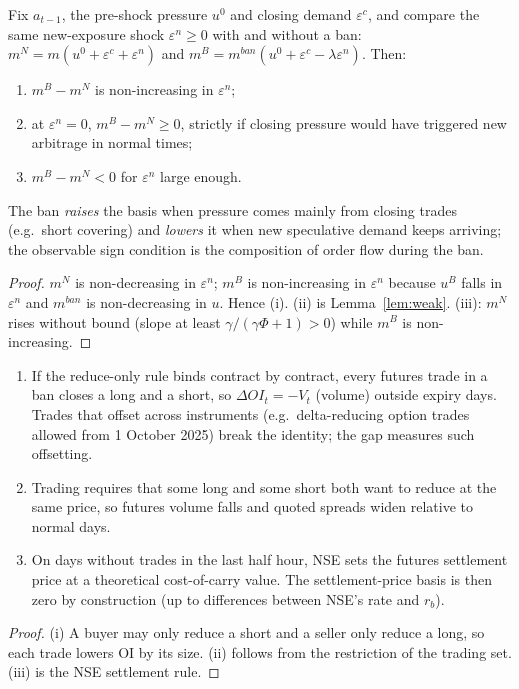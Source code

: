 \begin{proposition}\label{prop:level}
Fix $a_{t-1}$, the pre-shock pressure $u^0$ and closing demand $\varepsilon^c$, and compare the same new-exposure shock
$\varepsilon^n\ge0$ with and without a ban: $m^N=m(u^0+\varepsilon^c+\varepsilon^n)$ and
$m^B=m^{ban}(u^0+\varepsilon^c-\lambda\varepsilon^n)$. Then:
\begin{enumerate}[label=(\roman*),leftmargin=1.8em,itemsep=1pt]
\item $m^B-m^N$ is non-increasing in $\varepsilon^n$;
\item at $\varepsilon^n=0$, $m^B-m^N\ge0$, strictly if closing pressure would have triggered new arbitrage in normal times;
\item $m^B-m^N<0$ for $\varepsilon^n$ large enough.
\end{enumerate}
The ban \emph{raises} the basis when pressure comes mainly from closing trades (e.g.\ short covering) and \emph{lowers} it
when new speculative demand keeps arriving; the observable sign condition is the composition of order flow during the ban.
\end{proposition}
\begin{proof}
$m^N$ is non-decreasing in $\varepsilon^n$; $m^B$ is non-increasing in $\varepsilon^n$ because $u^B$ falls in $\varepsilon^n$
and $m^{ban}$ is non-decreasing in $u$. Hence (i). (ii) is Lemma~\ref{lem:weak}. (iii): $m^N$ rises without bound (slope
at least $\gamma/(\gamma\Phi+1)>0$) while $m^B$ is non-increasing.
\end{proof}

\begin{proposition}\label{prop:trade}
\begin{enumerate}[label=(\roman*),leftmargin=1.8em,itemsep=1pt]
\item If the reduce-only rule binds contract by contract, every futures trade in a ban closes a long and a short, so
$\Delta OI_t=-V_t$ (volume) outside expiry days. Trades that offset across instruments (e.g.\ delta-reducing option trades
allowed from 1 October 2025) break the identity; the gap measures such offsetting.
\item Trading requires that some long and some short both want to reduce at the same price, so futures volume falls
and quoted spreads widen relative to normal days.
\item On days without trades in the last half hour, NSE sets the futures settlement price at a theoretical cost-of-carry
value. The settlement-price basis is then zero by construction (up to differences between NSE's rate and $r_b$).
\end{enumerate}
\end{proposition}
\begin{proof}
(i) A buyer may only reduce a short and a seller only reduce a long, so each trade lowers OI by its size. (ii) follows from
the restriction of the trading set. (iii) is the NSE settlement rule.
\end{proof}

